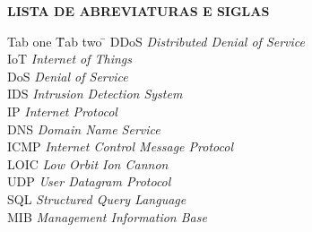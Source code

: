 %  
%  
%  
%   
\centerline{\textbf{LISTA DE ABREVIATURAS E SIGLAS}}

\vspace{0,75cm}

\begin{tabbing}
	Tab one \quad \=  Tab two \= \kill
	DDoS  \>  \textit{Distributed Denial of Service}  \\
	IoT \> \textit{Internet of Things}  \\
	DoS \> \textit{Denial of Service} \\
	IDS \> \textit{Intrusion Detection System} \\
	IP \> \textit{Internet Protocol} \\
	DNS \> \textit{Domain Name Service} \\
	ICMP \> \textit{Internet Control Message Protocol}\\ 
	LOIC \>  \textit{Low Orbit Ion Cannon} \\
	UDP \> \textit{User Datagram Protocol} \\
	SQL \> \textit{Structured Query Language}\\
	MIB \> \textit{Management Information Base}\\
\end{tabbing}

